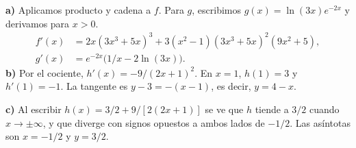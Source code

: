 \textbf{a)} Aplicamos producto y cadena a $f$. Para $g$,
escribimos $g(x)=\ln(3x)e^{-2x}$ y derivamos para $x>0$.
\[
\begin{aligned}
f'(x)&=2x(3x^3+5x)^3+3(x^2-1)(3x^3+5x)^2(9x^2+5),\\
g'(x)&=e^{-2x}\bigl(1/x-2\ln(3x)\bigr).
\end{aligned}
\]
\textbf{b)} Por el cociente, $h'(x)=-9/(2x+1)^2$.
En $x=1$, $h(1)=3$ y $h'(1)=-1$.
La tangente es $y-3=-(x-1)$, es decir, $\boxed{y=4-x}$.

\textbf{c)} Al escribir $h(x)=3/2+9/[2(2x+1)]$ se ve que
$h$ tiende a $3/2$ cuando $x\to\pm\infty$, y que diverge con signos
opuestos a ambos lados de $-1/2$. Las asíntotas son
$\boxed{x=-1/2}$ y $\boxed{y=3/2}$.
